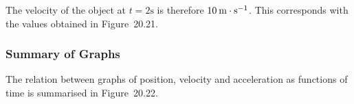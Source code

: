     
          
          \label{m38795*id72897}The velocity of the object at \begin{math}t=2\mathrm{s}\end{math} is therefore \begin{math}10\phantom{\rule{2pt}{0ex}}\mathrm{m}\ensuremath{\cdot}\mathrm{s}{}^{-1}\end{math}. This corresponds with the values obtained in Figure~20.21.\par 

        
      
 
    \label{m38795*cid8}
            \subsubsection{ Summary of Graphs}
            \nopagebreak
            \label{m38795*id73116}The relation between graphs of position, velocity and acceleration as functions of time is summarised in Figure~20.22.\par 
      
    \setcounter{subfigure}{0}


